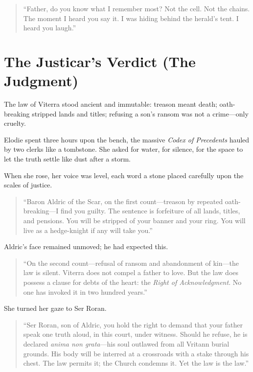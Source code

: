 \documentclass[11pt,twoside]{book}
\begin{document}
\begin{quote}
``Father, do you know what I remember most? Not the cell. Not the chains. The moment I heard you say it. I was hiding behind the herald's tent. I heard you laugh.''
\end{quote}

\newpage

\section*{The Justicar's Verdict (The Judgment)}

The law of Viterra stood ancient and immutable: treason meant death; oath-breaking stripped lands and titles; refusing a son's ransom was not a crime---only cruelty.  

Elodie spent three hours upon the bench, the massive \textit{Codex of Precedents} hauled by two clerks like a tombstone. She asked for water, for silence, for the space to let the truth settle like dust after a storm.

When she rose, her voice was level, each word a stone placed carefully upon the scales of justice.

\begin{quote}
``Baron Aldric of the Scar, on the first count---treason by repeated oath-breaking---I find you guilty. The sentence is forfeiture of all lands, titles, and pensions. You will be stripped of your banner and your ring. You will live as a hedge-knight if any will take you.''
\end{quote}

Aldric's face remained unmoved; he had expected this.

\begin{quote}
``On the second count---refusal of ransom and abandonment of kin---the law is silent. Viterra does not compel a father to love. But the law does possess a clause for debts of the heart: the \textit{Right of Acknowledgment}. No one has invoked it in two hundred years.''
\end{quote}

She turned her gaze to Ser Roran.

\begin{quote}
``Ser Roran, son of Aldric, you hold the right to demand that your father speak one truth aloud, in this court, under witness. Should he refuse, he is declared \textit{anima non grata}---his soul outlawed from all Vritann burial grounds. His body will be interred at a crossroads with a stake through his chest. The law permits it; the Church condemns it. Yet the law is the law.''
\end{quote}
\end{document}
